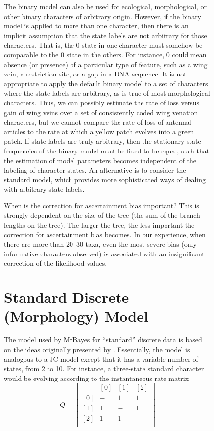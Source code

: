 \documentclass[12pt]{book}
\begin{document}
\begin{figure}[h]
The binary model can also be used for ecological, morphological, or other binary characters of
arbitrary origin. However, if the binary model is applied to more than one character, then there is
an implicit assumption that the state labels are not arbitrary for those characters. That is, the 0
state in one character must somehow be comparable to the 0 state in the others. For instance, 0
could mean absence (or presence) of a particular type of feature, such as a wing vein, a
restriction site, or a gap in a DNA sequence. It is not appropriate to apply the default binary
model to a set of characters where the state labels are arbitrary, as is true of most morphological
characters. Thus, we can possibly estimate the rate of loss versus gain of wing veins over a set of
consistently coded wing venation characters, but we cannot compare the rate of loss of antennal
articles to the rate at which a yellow patch evolves into a green patch. If state labels are truly
arbitrary, then the stationary state frequencies of the binary model must be fixed to be equal,
such that the estimation of model parameters becomes independent of the labeling of character
states. An alternative is to consider the standard model, which provides more sophisticated ways
of dealing with arbitrary state labels.

When is the correction for ascertainment bias important? This is strongly dependent on the size of
the tree (the sum of the branch lengths on the tree). The larger the tree, the less important the
correction for ascertainment bias becomes. In our experience, when there are more than 20--30 taxa,
even the most severe bias (only informative characters observed) is associated with an
insignificant correction of the likelihood values.

\section{Standard Discrete (Morphology) Model}

The model used by MrBayes for ``standard'' discrete data is based on the ideas originally presented
by \citet{lewis01}. Essentially, the model is analogous to a JC model except that it has a variable
number of states, from 2 to 10. For instance, a three-state standard character would be evolving
according to the instantaneous rate matrix
\[
Q=\begin{bmatrix}
    & [0] & [1] & [2]\\
 [0]& - & 1 & 1\\
 [1]& 1& -  & 1\\
 [2]& 1& 1  & -\\
\end{bmatrix}
\]


\end{figure}
\end{document}
